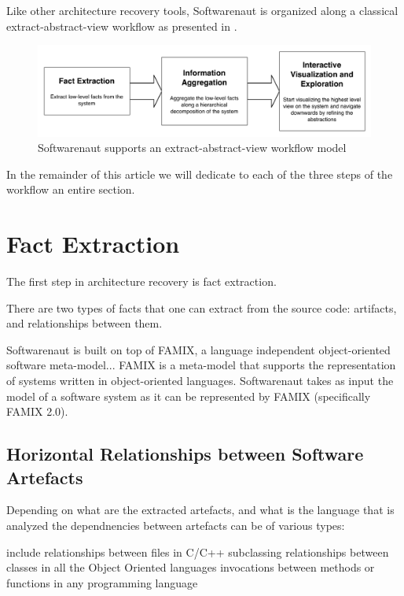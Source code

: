 \documentclass[preprint,12pt]{elsarticle}
\begin{document}
Like other architecture recovery tools, Softwarenaut is organized along a classical extract-abstract-view workflow as presented in .

\begin{figure}[h]
\begin{center}
\includegraphics[width=\linewidth]{images/SnautFlow}
\caption{Softwarenaut supports an extract-abstract-view workflow model}
\end{center}
\end{figure}

In the remainder of this article we will dedicate to each of the three steps of the workflow an entire section. 




\newpage
\section {Fact Extraction}
\label{sec:facts}

The first step in architecture recovery is fact extraction. 

There are two types of facts that one can extract from the source code: artifacts, and relationships between them. 

Softwarenaut is built on top of FAMIX, a language independent object-oriented software meta-model...
FAMIX is a meta-model that supports the representation of systems written in object-oriented languages. Softwarenaut takes as input the model of a software system as it can be represented by FAMIX (specifically FAMIX 2.0). 


\subsection {Horizontal Relationships between Software Artefacts}

Depending on what are the extracted artefacts, and what is the language that is analyzed the dependnencies between artefacts can be of various types:

include relationships between files in C/C++
subclassing relationships between classes in all the Object Oriented languages
invocations between methods or functions in any programming language
\end{document}
